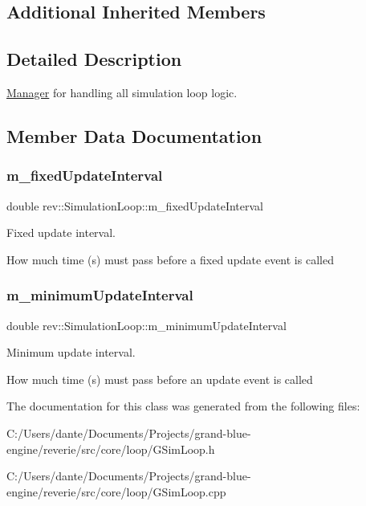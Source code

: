 \subsection*{Additional Inherited Members}


\subsection{Detailed Description}
\mbox{\hyperlink{classrev_1_1_manager}{Manager}} for handling all simulation loop logic. 

\subsection{Member Data Documentation}
\mbox{\label{classrev_1_1_simulation_loop_a3d754a1b34a79f17e9245a9d04442ff8}} 
\subsubsection{\texorpdfstring{m\_fixedUpdateInterval}{m\_fixedUpdateInterval}}
{\footnotesize\ttfamily double rev\+::\+Simulation\+Loop\+::m\+\_\+fixed\+Update\+Interval\hspace{0.3cm}{\ttfamily [protected]}}



Fixed update interval. 

How much time (s) must pass before a fixed update event is called \mbox{\label{classrev_1_1_simulation_loop_aa74c432b0fd79e8d5b74c320fcae3906}} 
\subsubsection{\texorpdfstring{m\_minimumUpdateInterval}{m\_minimumUpdateInterval}}
{\footnotesize\ttfamily double rev\+::\+Simulation\+Loop\+::m\+\_\+minimum\+Update\+Interval\hspace{0.3cm}{\ttfamily [protected]}}



Minimum update interval. 

How much time (s) must pass before an update event is called 

The documentation for this class was generated from the following files\+:\begin{DoxyCompactItemize}
\item 
C\+:/\+Users/dante/\+Documents/\+Projects/grand-\/blue-\/engine/reverie/src/core/loop/G\+Sim\+Loop.\+h\item 
C\+:/\+Users/dante/\+Documents/\+Projects/grand-\/blue-\/engine/reverie/src/core/loop/G\+Sim\+Loop.\+cpp\end{DoxyCompactItemize}
